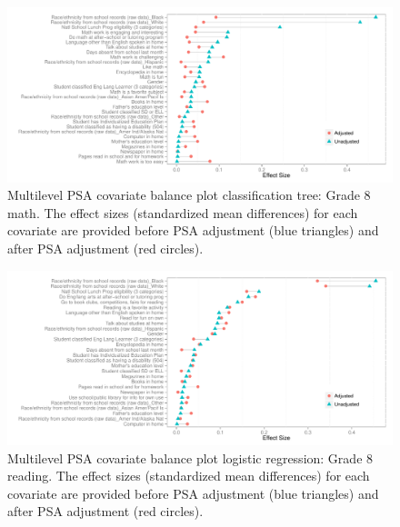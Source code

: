 \begin{figure}[h!]
\begin{center}
\includegraphics[width=\textwidth]{../Figures2009/g8math-mlpsa-ctree-balance.pdf}
\caption[Multilevel PSA covariate balance plot classification tree: Grade 8 math]{Multilevel PSA covariate balance plot classification tree: Grade 8 math. The effect sizes (standardized mean differences) for each covariate are provided before PSA adjustment (blue triangles) and after PSA adjustment (red circles).}
\end{center}
\end{figure}

\begin{figure}[h!]
\begin{center}
\includegraphics[width=\textwidth]{../Figures2009/g8read-mlpsa-lr-balance.pdf}
\caption[Multilevel PSA covariate balance plot logistic regression: Grade 8 reading]{Multilevel PSA covariate balance plot logistic regression: Grade 8 reading. The effect sizes (standardized mean differences) for each covariate are provided before PSA adjustment (blue triangles) and after PSA adjustment (red circles).}
\end{center}
\end{figure}

